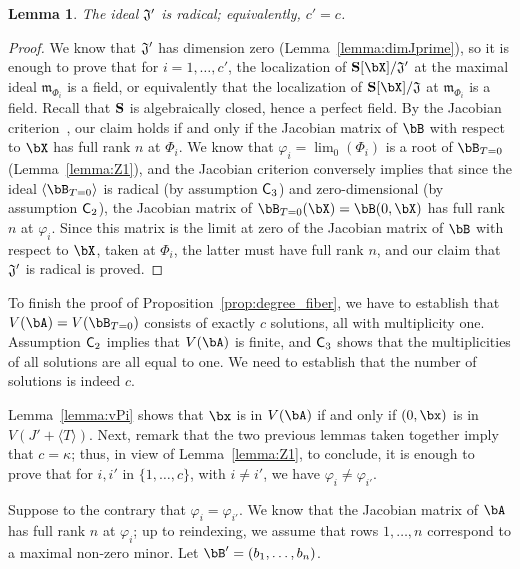 \documentclass[12pt]{article}
\newtheorem{lemma}[definition]{Lemma}
\begin{document}
\begin{lemma}\label{lemma:Jprimerad}
  The ideal $\frak{J}'$ is radical; equivalently, $c'=c$.
\end{lemma}
\begin{proof}
  We know that $\frak{J}'$ has dimension zero
  (Lemma~\ref{lemma:dimJprime}), so it is enough to prove that for
  $i=1,\dots,c'$, the localization of $\SS[\bX]/\frak{J}'$ at the
  maximal ideal $\mathfrak{m}_{\Phi_i}$ is a field, or equi\-valently
  that the localization of $\SS[\bX]/\frak{J}$ at
  $\mathfrak{m}_{\Phi_i}$ is a field.  Recall that $\mathbf{S}$ is
  algebraically closed, hence a perfect field. By the Jacobian
  criterion~\cite[Theorem~16.19.b]{Eisenbud95}, our claim holds if
  and only if the Jacobian matrix of $\bB$ with respect to $\bX$ has
  full rank $n$ at $\Phi_i$. We know that $\varphi_i=\lim_0(\Phi_i)$
  is a root of $\bB_{T=0}$ (Lemma~\ref{lemma:Z1}), and the Jacobian
  criterion conversely implies that since the ideal $\langle \bB_{T=0}
  \rangle$ is radical (by assumption $\mathsf{C}_3$) and zero-dimensional
  (by assumption $\mathsf{C}_2$), the Jacobian matrix of
  $\bB_{T=0}(\bX)=\bB(0,\bX)$ has full rank $n$ at $\varphi_i$. Since
  this matrix is the limit at zero of the Jacobian matrix of $\bB$
  with respect to $\bX$, taken at $\Phi_i$, the latter must have full
  rank $n$, and our claim that $\frak{J}'$ is radical is proved.
\end{proof}

To finish the proof of Proposition~\ref{prop:degree_fiber}, we have to
establish that $V(\bA)=V(\bB_{T=0})$ consists of exactly $c$
solutions, all with multiplicity one. Assumption $\mathsf{C}_2$ implies
that $V(\bA)$ is finite, and $\mathsf{C}_3$ shows that the multiplicities
of all solutions are all equal to one. We need to establish that the number
of solutions is indeed $c$.

Lemma~\ref{lemma:vPi} shows that $\bx$ is in $V(\bA)$ if and only if
$(0,\bx)$ is in $V(J' + \langle T\rangle)$. Next, remark that the two
previous lemmas taken together imply that $c=\kappa$; thus, in view of
Lemma~\ref{lemma:Z1}, to conclude, it is enough to prove that for
$i,i'$ in $\{1,\dots,c\}$, with $i \ne i'$, we have $\varphi_i \ne
\varphi_{i'}$.

Suppose to the contrary that $\varphi_i = \varphi_{i'}$. We know that
the Jacobian matrix of $\bA$ has full rank $n$ at $\varphi_i$; up to
reindexing, we assume that rows $1,\dots,n$ correspond to a maximal
non-zero minor. Let $\bB'=(b_1,\dots,b_n)$.
\end{document}
